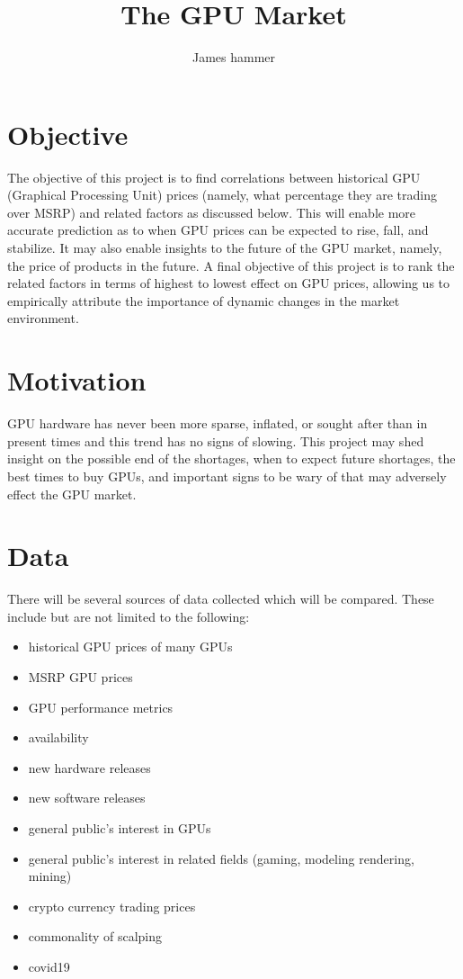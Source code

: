 \documentclass[letterpaper, 10 pt, conference]{ieeeconf}  %
\title{\LARGE \bf
The GPU Market
}
\author{James hammer%
}
\begin{document}
\maketitle
\thispagestyle{empty}
\pagestyle{empty}

\section{Objective}
The objective of this project is to find correlations between historical GPU (Graphical Processing Unit) prices (namely, what percentage they are trading over MSRP) and related factors as discussed below. This will enable more accurate prediction as to when GPU prices can be expected to rise, fall, and stabilize. It may also enable insights to the future of the GPU market, namely, the price of products in the future. A final objective of this project is to rank the related factors in terms of highest to lowest effect on GPU prices, allowing us to empirically attribute the importance of dynamic changes in the market environment.

\section{Motivation}
GPU hardware has never been more sparse, inflated, or sought after than in present times and this trend has no signs of slowing. This project may shed insight on the possible end of the shortages, when to expect future shortages, the best times to buy GPUs, and important signs to be wary of that may adversely effect the GPU market. 

\section{Data}
There will be several sources of data collected which will be compared. These include but are not limited to the following: 

\begin{itemize}
\item historical GPU prices of many GPUs
\item MSRP GPU prices
\item GPU performance metrics
\item availability
\item new hardware releases
\item new software releases
\item general public's interest in GPUs
\item general public's interest in related fields (gaming, modeling rendering, mining)
\item crypto currency trading prices
\item commonality of scalping
\item covid19
\end{itemize}
\end{document}
